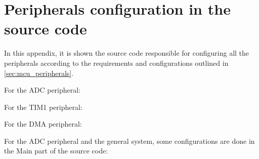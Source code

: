 \chapter{Peripherals configuration in the source code} \label{app:peripherals}

In this appendix, it is shown the source code responsible for configuring all the peripherals according to the requirements and configurations outlined in \cref{sec:mcu_peripherals}.

For the ADC peripheral:

For the TIM1 peripheral:

For the DMA peripheral:

For the ADC peripheral and the general system, some configurations are done in the Main part of the source code:
